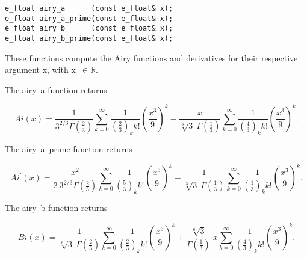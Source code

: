\begin{lstlisting}
e_float airy_a      (const e_float& x);
e_float airy_a_prime(const e_float& x);
e_float airy_b      (const e_float& x);
e_float airy_b_prime(const e_float& x);
\end{lstlisting}

\vspace{6.0pt}

 These functions compute the Airy functions and derivatives
for their respective argument {\courier x}, with {\courier x}~$\in\mathbb{R}$.

\vspace{6.0pt}

 The {\courier airy\underline\ a} function
returns~\cite{wolframfunctions:website}

\begin{equation}
Ai(x) =
\frac{1}{3^{2/3} \Gamma(\frac{2}{3})}
\sum_{k=0}^{\infty} \frac{1}{\left(\frac{2}{3}\right)_{k} k!}
\left(\frac{x^3}{9}\right)^k
-
\frac{x}{\sqrt[3]{3}\ \Gamma(\frac{1}{3})}
\sum_{k=0}^{\infty} \frac{1}{\left(\frac{4}{3}\right)_{k} k!}
\left(\frac{x^3}{9}\right)^k.
\end{equation}

\vspace{6.0pt}

 The {\courier airy\underline\ a\underline\ prime} function
returns~\cite{wolframfunctions:website}

\begin{equation}
Ai^{\prime}(x) =
\frac{x^2}{2\ 3^{2/3} \Gamma(\frac{2}{3})}
\sum_{k=0}^{\infty} \frac{1}{\left(\frac{5}{3}\right)_{k} k!}
\left(\frac{x^3}{9}\right)^k
-
\frac{1}{\sqrt[3]{3}\ \Gamma(\frac{1}{3})}
\sum_{k=0}^{\infty} \frac{1}{\left(\frac{1}{3}\right)_{k} k!}
\left(\frac{x^3}{9}\right)^k.
\end{equation}

\vspace{6.0pt}

 The {\courier airy\underline\ b} function
returns~\cite{wolframfunctions:website}

\begin{equation}
Bi(x) =
\frac{1}{\sqrt[6]{3}\ \Gamma(\frac{2}{3})}
\sum_{k=0}^{\infty} \frac{1}{\left(\frac{2}{3}\right)_{k} k!}
\left(\frac{x^3}{9}\right)^k
+
\frac{\sqrt[6]{3}}{\Gamma(\frac{1}{3})}
\ x
\sum_{k=0}^{\infty} \frac{1}{\left(\frac{4}{3}\right)_{k} k!}
\left(\frac{x^3}{9}\right)^k.
\end{equation}

